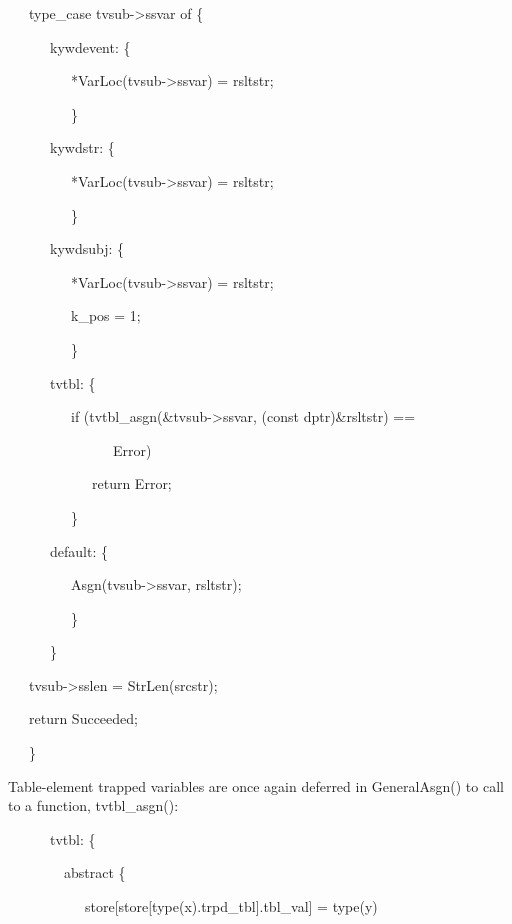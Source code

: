 {\ttfamily\mdseries
\ \ \ type\_case tvsub-{\textgreater}ssvar of \{}

{\ttfamily\mdseries
\ \ \ \ \ \ kywdevent: \{}

{\ttfamily\mdseries
\ \ \ \ \ \ \ \ \ *VarLoc(tvsub-{\textgreater}ssvar) = rsltstr;}

{\ttfamily\mdseries
\ \ \ \ \ \ \ \ \ \}}

{\ttfamily\mdseries
\ \ \ \ \ \ kywdstr: \{}

{\ttfamily\mdseries
\ \ \ \ \ \ \ \ \ *VarLoc(tvsub-{\textgreater}ssvar) = rsltstr;}

{\ttfamily\mdseries
\ \ \ \ \ \ \ \ \ \}}

{\ttfamily\mdseries
\ \ \ \ \ \ kywdsubj: \{}

{\ttfamily\mdseries
\ \ \ \ \ \ \ \ \ *VarLoc(tvsub-{\textgreater}ssvar) = rsltstr;}

{\ttfamily\mdseries
\ \ \ \ \ \ \ \ \ k\_pos = 1;}

{\ttfamily\mdseries
\ \ \ \ \ \ \ \ \ \}}

{\ttfamily\mdseries
\ \ \ \ \ \ tvtbl: \{}

{\ttfamily\mdseries
\ \ \ \ \ \ \ \ \ if (tvtbl\_asgn(\&tvsub-{\textgreater}ssvar, (const dptr)\&rsltstr) ==}

{\ttfamily\mdseries
\ \ \ \ \ \ \ \ \ \ \ \ \ \ \ Error)}

{\ttfamily\mdseries
\ \ \ \ \ \ \ \ \ \ \ \ return Error;}

{\ttfamily\mdseries
\ \ \ \ \ \ \ \ \ \}}

{\ttfamily\mdseries
\ \ \ \ \ \ default: \{}

{\ttfamily\mdseries
\ \ \ \ \ \ \ \ \ Asgn(tvsub-{\textgreater}ssvar, rsltstr);}

{\ttfamily\mdseries
\ \ \ \ \ \ \ \ \ \}}

{\ttfamily\mdseries
\ \ \ \ \ \ \}}

{\ttfamily\mdseries
\ \ \ tvsub-{\textgreater}sslen = StrLen(srcstr);}

{\ttfamily\mdseries
\ \ \ return Succeeded;}

{\ttfamily\mdseries
\ \ \ \}}


Table-element trapped variables are once again deferred in GeneralAsgn() to call to a function, tvtbl\_asgn():

{\ttfamily\mdseries
\ \ \ \ \ \ tvtbl: \{}

{\ttfamily\mdseries
\ \ \ \ \ \ \ \ abstract \{}

{\ttfamily\mdseries
\ \ \ \ \ \ \ \ \ \ \ store[store[type(x).trpd\_tbl].tbl\_val] = type(y)}

